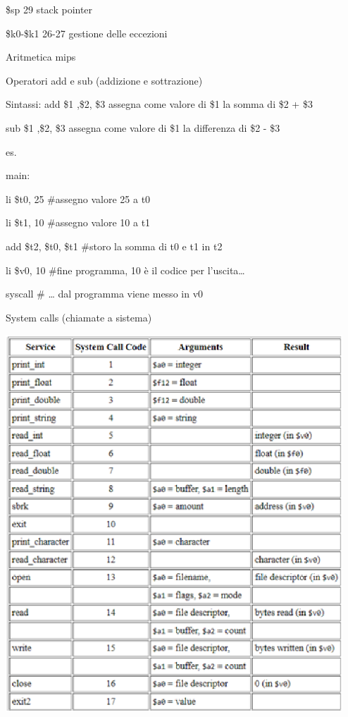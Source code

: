 \documentclass{article} %
\begin{document}
\noindent \$sp   29   stack pointer 

\noindent \$k0-\$k1   26-27   gestione delle eccezioni 

\noindent Aritmetica mips

\noindent 

\noindent Operatori add e sub  (addizione e sottrazione)

 Sintassi: add \$1 ,\$2, \$3      assegna come valore di \$1 la somma di \$2 + \$3

   sub \$1 ,\$2, \$3      assegna come valore di \$1 la differenza di \$2 - \$3

\noindent es.

\noindent main:

 li \$t0, 25  \#assegno valore 25 a t0

 li \$t1, 10  \#assegno valore 10 a t1

 add \$t2, \$t0, \$t1 \#storo la somma di t0 e t1 in t2

 li \$v0, 10  \#fine programma, 10 \`{e} il codice per l'uscita{\dots}

 syscall   \# {\dots} dal programma viene messo in v0

\noindent 

\noindent System calls (chiamate a sistema)

\noindent \includegraphics*[width=4.98in, height=5.58in, keepaspectratio=false]{image1}
\end{document}
